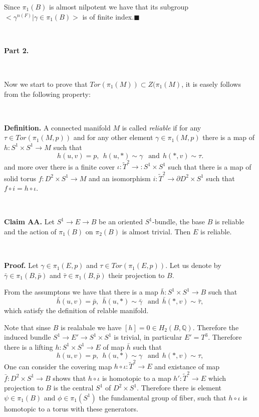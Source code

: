 \documentclass{article}
\def\i{\subset}%
\def\QQ{\mathbb{Q}}%
\begin{document}
Since $\pi_1(B)$ is almost nilpotent we have that its subgroup  $< \gamma^{n(F)}|\gamma\in \pi_1(B)>$ is of finite index.$\blacksquare$

\ 

{\bf Part 2.}

\ 

Now we start to prove that $Tor(\pi_1(M))\i Z(\pi_1(M)$, it is easely follows from the following property: 

\ 


{\bf Definition.} A connected manifold $M$ is called {\it reliable} if for any 
$\tau\in Tor(\pi_1(M,p))$ and for any other element $\gamma\in \pi_1(M,p)$ there is a map of $h:S^1\times S^1\to M$  such that 
$$h(u,v)= p,\ \ 
h(u,*)\sim\gamma\ \ \text{ and}\ \ 
h(*,v)\sim\tau.$$
and more over there is a finite cover $\iota:\tilde T^2\to :S^1\times S^1$ such that there is a map of solid torus $f:D^2\times S^1\to M$ and an isomorphism $i:\tilde T^2\to \partial D^2\times S^1$ such that $f\circ i=h\circ\iota$.


\ 

{\bf Claim AA.} Let $S^1\to E\to B$ be an oriented $S^1$-bundle, the base  $B$ is reliable and the action of $\pi_1(B)$ on $\pi_2(B)$ is almost trivial. 
Then $E$ is reliable.

\ 

{\bf Proof.} Let $\gamma\in \pi_1(E,p)$ and $\tau\in Tor(\pi_1(E,p))$. 
Let us denote by $\bar\gamma\in \pi_1(B,\bar p)$ and 
$\bar\tau\in \pi_1(B,\bar p)$ their projection to $B$.

From the assumptons we have 
that there is a map 
$\bar h:S^1\times S^1\to B$ such that 
$$\bar h(u,v)=\bar p,\ \ 
\bar h(u,*)\sim\bar\gamma\ \ \text{ and}\ \ 
\bar h(*,v)\sim\bar\tau,$$
which satisfy the definition of relable manifold.

Note that sinse $B$ is realabale we have $[h]=0\in H_2(B,\QQ)$. Therefore the induced bundle $S^1\to E'\to S^1\times S^1$ is trivial, in particular $E'=T^3$.
Therefore there is a lifting $h:S^1\times S^1\to E$ of map $\bar h$ such that
$$ h(u,v)= p,\ \ 
 h(u,*)\sim\gamma\ \ \text{ and}\ \ 
 h(*,v)\sim\tau,$$
One can consider the covering map $h\circ\iota:\tilde T^2\to E$ and existance of  map 
$\bar f:D^2\times S^1\to B$ shows that $h\circ\iota$ is homotopic to a map
$h':\tilde T^2\to E$ which projection to $B$ is the central $S^1$ of 
$D^2\times S^1$. 
Therefore there is element $\psi\in\pi_1(B)$ and $\phi\in\pi_1(S^1)$ the fundamental group of fiber, such that $h\circ\iota$ is homotopic to a torus with these generators.
\end{document}
